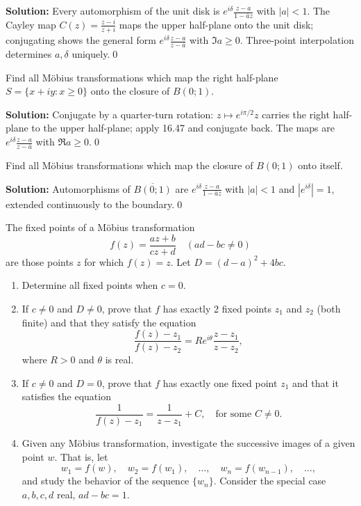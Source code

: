 \bigskip\noindent\textbf{Solution:}
Every automorphism of the unit disk is $e^{i\delta}\frac{z-a}{1-\bar a z}$ with $|a|<1$. The Cayley map $C(z)=\frac{z-i}{z+i}$ maps the upper half-plane onto the unit disk; conjugating shows the general form $e^{i\delta}\frac{z-a}{z-\bar a}$ with $\Im a\ge0$. Three-point interpolation determines $a,\delta$ uniquely.\qed


\begin{problembox}
Find all Möbius transformations which map the right half-plane \( S = \{ x + i y : x \geq 0 \} \) onto the closure of \( B(0; 1) \).
\end{problembox}

\bigskip\noindent\textbf{Solution:}
Conjugate by a quarter-turn rotation: $z\mapsto e^{i\pi/2}z$ carries the right half-plane to the upper half-plane; apply 16.47 and conjugate back. The maps are $e^{i\delta}\frac{z-a}{z-\bar a}$ with $\Re a\ge0$.\qed


\begin{problembox}
Find all Möbius transformations which map the closure of \( B(0; 1) \) onto itself.
\end{problembox}

\bigskip\noindent\textbf{Solution:}
Automorphisms of $\overline{B(0;1)}$ are $e^{i\delta}\frac{z-a}{1-\bar a z}$ with $|a|<1$ and $|e^{i\delta}|=1$, extended continuously to the boundary.\qed


\begin{problembox}
The fixed points of a Möbius transformation
\[ f(z) = \frac{a z + b}{c z + d} \quad (ad - bc \neq 0) \]
are those points \( z \) for which \( f(z) = z \). Let \( D = (d - a)^2 + 4bc \).
\begin{enumerate}[label=(\alph*)]
\item Determine all fixed points when \( c = 0 \).
\item If \( c \neq 0 \) and \( D \neq 0 \), prove that \( f \) has exactly 2 fixed points \( z_1 \) and \( z_2 \) (both finite) and that they satisfy the equation
\[ \frac{f(z) - z_1}{f(z) - z_2} = R e^{i \theta} \frac{z - z_1}{z - z_2}, \]
where \( R > 0 \) and \( \theta \) is real.
\item If \( c \neq 0 \) and \( D = 0 \), prove that \( f \) has exactly one fixed point \( z_1 \) and that it satisfies the equation
\[ \frac{1}{f(z) - z_1} = \frac{1}{z - z_1} + C, \quad \text{for some } C \neq 0. \]
\item Given any Möbius transformation, investigate the successive images of a given point \( w \). That is, let
\[ w_1 = f(w), \quad w_2 = f(w_1), \quad \ldots, \quad w_n = f(w_{n-1}), \quad \ldots, \]
and study the behavior of the sequence \( \{ w_n \} \). Consider the special case \( a, b, c, d \) real, \( ad - bc = 1 \).
\end{enumerate}
\end{problembox}

